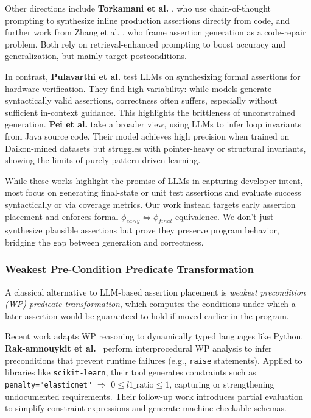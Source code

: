 \documentclass[8pt]{extarticle}
\begin{document}
Other directions include \textbf{Torkamani et al.} \cite{Torkamani2024-Assertify}, who use chain-of-thought prompting to synthesize inline production assertions directly from code, and further work from Zhang et al. \cite{Li2025-LLM-Assertion-Gen}, who frame assertion generation as a code-repair problem. Both rely on retrieval-enhanced prompting to boost accuracy and generalization, but mainly target postconditions.

In contrast, \textbf{Pulavarthi et al.} \cite{Pulavarthi2024-LLM-HW-Assertions} test LLMs on synthesizing formal assertions for hardware verification. They find high variability: while models generate syntactically valid assertions, correctness often suffers, especially without sufficient in-context guidance. This highlights the brittleness of unconstrained generation. \textbf{Pei et al.} \cite{Pei2023-LLM-Invariants} take a broader view, using LLMs to infer loop invariants from Java source code. Their model achieves high precision when trained on Daikon-mined datasets but struggles with pointer-heavy or structural invariants, showing the limits of purely pattern-driven learning.

While these works highlight the promise of LLMs in capturing developer intent, most focus on generating final-state or unit test assertions and evaluate success syntactically or via coverage metrics. Our work instead targets early assertion placement and enforces formal \(\phi_{early} \Leftrightarrow \phi_{final}\) equivalence. We don't just synthesize plausible assertions but prove they preserve program behavior, bridging the gap between generation and correctness.

\subsubsection{Weakest Pre-Condition Predicate Transformation}

A classical alternative to LLM-based assertion placement is \textit{weakest precondition (WP) predicate transformation}, which computes the conditions under which a later assertion would be guaranteed to hold if moved earlier in the program.

Recent work adapts WP reasoning to dynamically typed languages like Python. \textbf{Rak-amnouykit et al.}~\cite{rak-amnouykit2023weakest} perform interprocedural WP analysis to infer preconditions that prevent runtime failures (e.g., \texttt{raise} statements). Applied to libraries like \texttt{scikit-learn}, their tool generates constraints such as \texttt{penalty="elasticnet"} $\Rightarrow$ \texttt{$0 \leq l1\_\text{ratio} \leq 1$}, capturing or strengthening undocumented requirements. Their follow-up work \cite{baudart2022raise} introduces partial evaluation to simplify constraint expressions and generate machine-checkable schemas.
\end{document}
